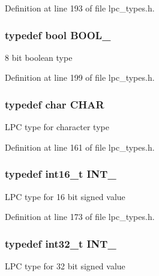 Definition at line 193 of file lpc\+\_\+types.\+h.

\subsubsection[{\texorpdfstring{B\+O\+O\+L\+\_\+8}{BOOL_8}}]{\setlength{\rightskip}{0pt plus 5cm}typedef bool {\bf B\+O\+O\+L\+\_}}\hypertarget{group__LPC__Types__Public__Types_ga7cc7a8cc54a0a73fbfcc1eb0b792148d}{}\label{group__LPC__Types__Public__Types_ga7cc7a8cc54a0a73fbfcc1eb0b792148d}
8 bit boolean type 

Definition at line 199 of file lpc\+\_\+types.\+h.

\subsubsection[{\texorpdfstring{C\+H\+AR}{CHAR}}]{\setlength{\rightskip}{0pt plus 5cm}typedef char {\bf C\+H\+AR}}\hypertarget{group__LPC__Types__Public__Types_gaebb9e13210d88d43e32e735ada43a425}{}\label{group__LPC__Types__Public__Types_gaebb9e13210d88d43e32e735ada43a425}
L\+PC type for character type 

Definition at line 161 of file lpc\+\_\+types.\+h.

\subsubsection[{\texorpdfstring{I\+N\+T\+\_\+16}{INT_16}}]{\setlength{\rightskip}{0pt plus 5cm}typedef int16\+\_\+t {\bf I\+N\+T\+\_}}\hypertarget{group__LPC__Types__Public__Types_gaae6e34a91bf60db05de64de7720df9a5}{}\label{group__LPC__Types__Public__Types_gaae6e34a91bf60db05de64de7720df9a5}
L\+PC type for 16 bit signed value 

Definition at line 173 of file lpc\+\_\+types.\+h.

\subsubsection[{\texorpdfstring{I\+N\+T\+\_\+32}{INT_32}}]{\setlength{\rightskip}{0pt plus 5cm}typedef int32\+\_\+t {\bf I\+N\+T\+\_}}\hypertarget{group__LPC__Types__Public__Types_ga3a17614f3a1b67eaf20781d8ec16a652}{}\label{group__LPC__Types__Public__Types_ga3a17614f3a1b67eaf20781d8ec16a652}
L\+PC type for 32 bit signed value 

